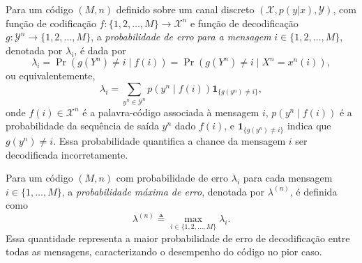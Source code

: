 \begin{definition}
Para um código $(M,n)$ definido sobre um canal discreto $(\mathcal{X}, p(y|x),
\mathcal{Y})$, com função de codificação $f: \{1, 2, \ldots, M\} \to
\mathcal{X}^n$ e função de decodificação $g: \mathcal{Y}^n \to \{1, 2, \ldots, M\}$, a
\emph{probabilidade de erro para a mensagem} $i \in \{1, 2, \ldots, M\}$, denotada por
$\lambda_i$, é dada por
\begin{equation}
\lambda_i = \Pr(g(Y^n) \neq i \mid f(i)) = \Pr(g(Y^n) \neq i \mid X^n = x^n(i)) ,
\end{equation}
ou equivalentemente,
\begin{equation}
\lambda_i = \sum_{y^n \in \mathcal{Y}^n} p(y^n \mid f(i)) \mathbf{1}_{\{g(y^n) \neq i\}},
\end{equation}
onde $f(i) \in \mathcal{X}^n$ é a palavra-código associada à mensagem $i$,
$p(y^n \mid f(i))$ é a probabilidade da sequência de saída $y^n$ dado $f(i)$, e
$\mathbf{1}_{\{g(y^n) \neq i\}}$ indica que $g(y^n) \neq i$. Essa probabilidade
quantifica a chance da mensagem $i$ ser decodificada incorretamente.
\end{definition}


\begin{definition}
Para um código $(M,n)$ com probabilidade de erro $\lambda_i$ para cada mensagem $i \in \{1, \ldots, M\}$,
a \emph{probabilidade máxima de erro}, denotada por $\lambda^{(n)}$, é definida como
\begin{equation}
\lambda^{(n)} \triangleq \max_{ i \in \{1,2, \ldots, M \}} \lambda_i .
\end{equation}
Essa quantidade representa a maior probabilidade de erro de decodificação entre todas as mensagens, caracterizando o desempenho do código no pior caso.
\end{definition}




